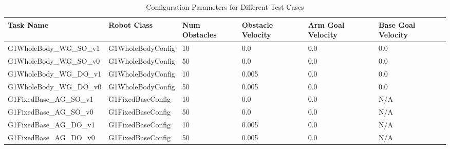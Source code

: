 \begin{sidewaystable}[htbp]
\centering
\captionsetup{width=0.95\textwidth}
\caption{Configuration Parameters for Different Test Cases}
\label{tab:config_parameters}

\begin{tabular}{p{5cm} |C{3.5cm} C{3cm} C{3.5cm} C{3.5cm} C{3.5cm}}
\toprule
\textbf{Task Name} & \textbf{Robot Class} & \textbf{Num Obstacles} & \textbf{Obstacle Velocity} & \textbf{Arm Goal Velocity} & \textbf{Base Goal Velocity} \\
\midrule
G1WholeBody\_WG\_SO\_v1 & G1WholeBodyConfig & 10 & 0.0 & 0.0 & 0.0 \\
G1WholeBody\_WG\_SO\_v0 & G1WholeBodyConfig & 50 & 0.0 & 0.0 & 0.0 \\
G1WholeBody\_WG\_DO\_v1 & G1WholeBodyConfig & 10 & 0.005 & 0.0 & 0.0 \\
G1WholeBody\_WG\_DO\_v0 & G1WholeBodyConfig & 50 & 0.005 & 0.0 & 0.0 \\
G1FixedBase\_AG\_SO\_v1 & G1FixedBaseConfig & 10 & 0.0 & 0.0 & N/A \\
G1FixedBase\_AG\_SO\_v0 & G1FixedBaseConfig & 50 & 0.0 & 0.0 & N/A \\
G1FixedBase\_AG\_DO\_v1 & G1FixedBaseConfig & 10 & 0.005 & 0.0 & N/A \\
G1FixedBase\_AG\_DO\_v0 & G1FixedBaseConfig & 50 & 0.005 & 0.0 & N/A \\
\bottomrule
\end{tabular}

\end{sidewaystable}
